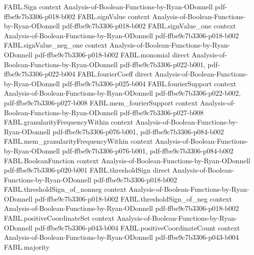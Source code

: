 \begin{theorem}
\label{FABL.coordinateLaplacian_apply}
\leanok
{}
\proofstep
  {FABL.Sign}
  {context}
  {Analysis-of-Boolean-Functions-by-Ryan-ODonnell}
  {pdf-ffbe9c7b3306-p018-b002}
\proofstep
  {FABL.signValue}
  {context}
  {Analysis-of-Boolean-Functions-by-Ryan-ODonnell}
  {pdf-ffbe9c7b3306-p018-b002}
\proofstep
  {FABL.signValue_one}
  {context}
  {Analysis-of-Boolean-Functions-by-Ryan-ODonnell}
  {pdf-ffbe9c7b3306-p018-b002}
\proofstep
  {FABL.signValue_neg_one}
  {context}
  {Analysis-of-Boolean-Functions-by-Ryan-ODonnell}
  {pdf-ffbe9c7b3306-p018-b002}
\proofstep
  {FABL.monomial}
  {direct}
  {Analysis-of-Boolean-Functions-by-Ryan-ODonnell}
  {pdf-ffbe9c7b3306-p022-b001,
    pdf-ffbe9c7b3306-p022-b004}
\proofstep
  {FABL.fourierCoeff}
  {direct}
  {Analysis-of-Boolean-Functions-by-Ryan-ODonnell}
  {pdf-ffbe9c7b3306-p025-b004}
\proofstep
  {FABL.fourierSupport}
  {context}
  {Analysis-of-Boolean-Functions-by-Ryan-ODonnell}
  {pdf-ffbe9c7b3306-p022-b002,
    pdf-ffbe9c7b3306-p027-b008}
\proofstep
  {FABL.mem_fourierSupport}
  {context}
  {Analysis-of-Boolean-Functions-by-Ryan-ODonnell}
  {pdf-ffbe9c7b3306-p027-b008}
\proofstep
  {FABL.granularityFrequencyWithin}
  {context}
  {Analysis-of-Boolean-Functions-by-Ryan-ODonnell}
  {pdf-ffbe9c7b3306-p076-b001,
    pdf-ffbe9c7b3306-p084-b002}
\proofstep
  {FABL.mem_granularityFrequencyWithin}
  {context}
  {Analysis-of-Boolean-Functions-by-Ryan-ODonnell}
  {pdf-ffbe9c7b3306-p076-b001,
    pdf-ffbe9c7b3306-p084-b002}
\proofstep
  {FABL.BooleanFunction}
  {context}
  {Analysis-of-Boolean-Functions-by-Ryan-ODonnell}
  {pdf-ffbe9c7b3306-p020-b001}
\proofstep
  {FABL.thresholdSign}
  {direct}
  {Analysis-of-Boolean-Functions-by-Ryan-ODonnell}
  {pdf-ffbe9c7b3306-p018-b002}
\proofstep
  {FABL.thresholdSign_of_nonneg}
  {context}
  {Analysis-of-Boolean-Functions-by-Ryan-ODonnell}
  {pdf-ffbe9c7b3306-p018-b002}
\proofstep
  {FABL.thresholdSign_of_neg}
  {context}
  {Analysis-of-Boolean-Functions-by-Ryan-ODonnell}
  {pdf-ffbe9c7b3306-p018-b002}
\proofstep
  {FABL.positiveCoordinateSet}
  {context}
  {Analysis-of-Boolean-Functions-by-Ryan-ODonnell}
  {pdf-ffbe9c7b3306-p043-b004}
\proofstep
  {FABL.positiveCoordinateCount}
  {context}
  {Analysis-of-Boolean-Functions-by-Ryan-ODonnell}
  {pdf-ffbe9c7b3306-p043-b004}
\proofstep
  {FABL.majority}

\end{theorem}
